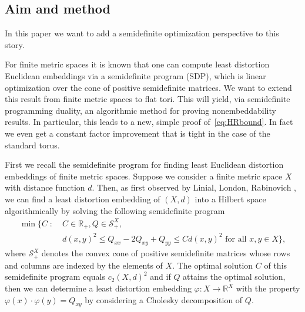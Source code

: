 \documentclass{amsart}
\newcommand{\R}{\mathbb{R}}
\begin{document}
%

\subsection{Aim and method}

In this paper we want to add a semidefinite optimization perspective
to this story.

For finite metric spaces it is known that one can compute least
distortion Euclidean embeddings via a semidefinite program (SDP),
which is linear optimization over the cone of positive semidefinite
matrices. We want to extend this result from finite metric spaces to
flat tori. This will yield, via semidefinite programming duality, an
algorithmic method for proving nonembeddability results. In
particular, this leads to a new, simple proof of~\eqref{eq:HRbound}.
In fact we even get a constant factor improvement that is tight in the case of the standard torus.

First we recall the semidefinite program for finding least Euclidean distortion
 embeddings of finite metric spaces.  Suppose we consider a
finite metric space $X$ with distance function $d$. Then, as first
observed by Linial, London, Rabinovich \cite{Linial1995a}, we can
find a least distortion embedding of $(X,d)$ into a Hilbert space
algorithmically by solving the following semidefinite program
\begin{equation}
  \label{eq:sdp-primal-low-distortion}
  \begin{split}
 \min\{C \; : \; & C \in \R_+, Q \in \mathcal{S}^X_+,\\
&    d(x,y)^2 \leq Q_{xx} - 2Q_{xy} +
Q_{yy} \leq C d(x,y)^2 \text{ for all } x, y \in X\},
\end{split}
\end{equation}
where $\mathcal{S}^X_+$ denotes the convex cone of positive
semidefinite matrices whose rows and columns are indexed by the
elements of $X$. The optimal solution $C$ of this semidefinite program
equals $c_2(X,d)^2$ and if $Q$ attains the optimal solution, then we
can determine a least distortion embedding $\varphi : X \to \R^X$ with
the property $\varphi(x) \cdot \varphi(y) = Q_{xy}$ by considering a
Cholesky decomposition of $Q$.
\end{document}
